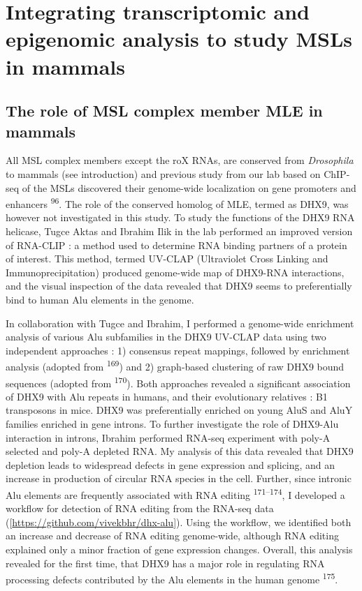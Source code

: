 \documentclass[11pt,twoside]{MPIthesis}
\theoremstyle{definition}
\theoremstyle{definition}
\theoremstyle{definition}
\theoremstyle{remark}
\begin{document}
\section{Integrating transcriptomic and epigenomic analysis to study
MSLs in
mammals}\label{integrating-transcriptomic-and-epigenomic-analysis-to-study-msls-in-mammals}

\subsection{The role of MSL complex member MLE in
mammals}\label{the-role-of-msl-complex-member-mle-in-mammals}

All MSL complex members except the roX RNAs, are conserved from
\emph{Drosophila} to mammals (see introduction) and previous study from
our lab based on ChIP-seq of the MSLs discovered their genome-wide
localization on gene promoters and enhancers \textsuperscript{96}. The
role of the conserved homolog of MLE, termed as DHX9, was however not
investigated in this study. To study the functions of the DHX9 RNA
helicase, Tugce Aktas and Ibrahim Ilik in the lab performed an improved
version of RNA-CLIP : a method used to determine RNA binding partners of
a protein of interest. This method, termed UV-CLAP (Ultraviolet Cross
Linking and Immunoprecipitation) produced genome-wide map of DHX9-RNA
interactions, and the visual inspection of the data revealed that DHX9
seems to preferentially bind to human Alu elements in the genome.

In collaboration with Tugce and Ibrahim, I performed a genome-wide
enrichment analysis of various Alu subfamilies in the DHX9 UV-CLAP data
using two independent approaches : 1) consensus repeat mappings,
followed by enrichment analysis (adopted from \textsuperscript{169}) and
2) graph-based clustering of raw DHX9 bound sequences (adopted from
\textsuperscript{170}). Both approaches revealed a significant
association of DHX9 with Alu repeats in humans, and their evolutionary
relatives : B1 transposons in mice. DHX9 was preferentially enriched on
young AluS and AluY families enriched in gene introns. To further
investigate the role of DHX9-Alu interaction in introns, Ibrahim
performed RNA-seq experiment with poly-A selected and poly-A depleted
RNA. My analysis of this data revealed that DHX9 depletion leads to
widespread defects in gene expression and splicing, and an increase in
production of circular RNA species in the cell. Further, since intronic
Alu elements are frequently associated with RNA editing
\textsuperscript{171--174}, I developed a workflow for detection of RNA
editing from the RNA-seq data
({[}{\url{https://github.com/vivekbhr/dhx-alu}}{]}). Using the workflow,
we identified both an increase and decrease of RNA editing genome-wide,
although RNA editing explained only a minor fraction of gene expression
changes. Overall, this analysis revealed for the first time, that DHX9
has a major role in regulating RNA processing defects contributed by the
Alu elements in the human genome \textsuperscript{175}.
\end{document}

